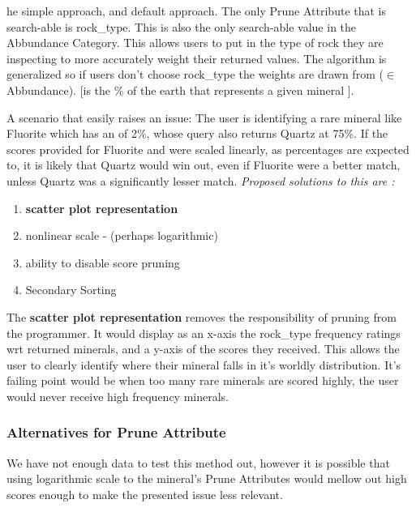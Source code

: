 \documentclass{article}
\def \Ab{Abbundance\xspace}
\def \PruneA{Prune Attribute\xspace}
\def \rt{rock\_type\xspace}
\begin{document}
he simple approach, and default approach. The only Prune Attribute that is search-able is \rt. This is also the only search-able value in the \Ab Category. This allows users to put in the type of rock they are inspecting to more accurately weight their returned values. The algorithm is generalized so if users don't choose \rt the weights are drawn from (\occ $\in$ \Ab). [\occ is the \% of the earth that represents a given mineral ].

\def \fl{Fluorite\xspace}
\def \qu{Quartz\xspace}
A scenario that easily raises an issue: The user is identifying a rare mineral like \fl which has an \occ of 2\%, whose query also returns \qu at 75\%. If the scores provided for \fl and \occ were scaled linearly, as  percentages are expected to, it is likely that \qu would win out, even if \fl were a better match, unless \qu was a significantly lesser match. {\em Proposed solutions to this are :}
\def\scr{{\bf scatter plot representation}\xspace}
\begin{enumerate}
\item \scr
\item nonlinear scale - (perhaps logarithmic)
\item ability to disable score pruning
\item Secondary Sorting
\end{enumerate}

The \scr removes the responsibility of pruning from the programmer. It would display as an x-axis the \rt frequency ratings wrt returned minerals, and a y-axis of the scores they received. This allows the user to clearly identify where their mineral falls in it's worldly distribution. It's failing point would be when too many rare minerals are scored highly, the user would never receive high frequency minerals.

\subsubsection*{Alternatives for \PruneA}
We have not enough data to test this method out, however it is possible that using logarithmic scale to the mineral's \PruneA{}s would mellow out high scores enough to make the presented issue less relevant.
\end{document}
